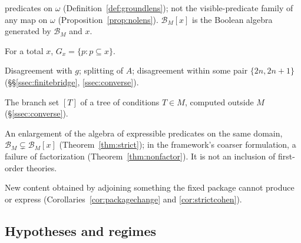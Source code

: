 \begin{description}[style=multiline,leftmargin=!,labelwidth=0.27\textwidth,labelsep=0.8em,itemsep=3pt]
predicates on $\omega$ (Definition~\ref{def:groundlens}); not the visible-predicate family of any
map on $\omega$ (Proposition~\ref{prop:nolens}). $\mathcal B_M[x]$ is the Boolean algebra generated
by $\mathcal B_M$ and $x$.
\item[Restriction filter.] For a total $x$, $G_x=\{p:p\subseteq x\}$.
\item[$D_g$, $E_A$, $D^\ast$.] Disagreement with $g$; splitting of $A$; disagreement within some pair
$\{2n,2n+1\}$ (\S\S\ref{ssec:finitebridge}, \ref{ssec:converse}).
\item[Coded closed set.] The branch set $[T]$ of a tree of conditions $T\in M$, computed outside
$M$ (\S\ref{ssec:converse}).
\item[Strict extension.] An enlargement of the algebra of expressible predicates on the same
domain, $\mathcal B_M\subsetneq\mathcal B_M[x]$ (Theorem~\ref{thm:strict}); in the framework's
coarser formulation, a failure of factorization (Theorem~\ref{thm:nonfactor}). It is not an
inclusion of first-order theories.
\item[Package change.] New content obtained by adjoining something the fixed package cannot produce
or express (Corollaries~\ref{cor:packagechange} and \ref{cor:strictcohen}).
\end{description}

\subsection{Hypotheses and regimes}\label{subsec:gate-predicates-list}

